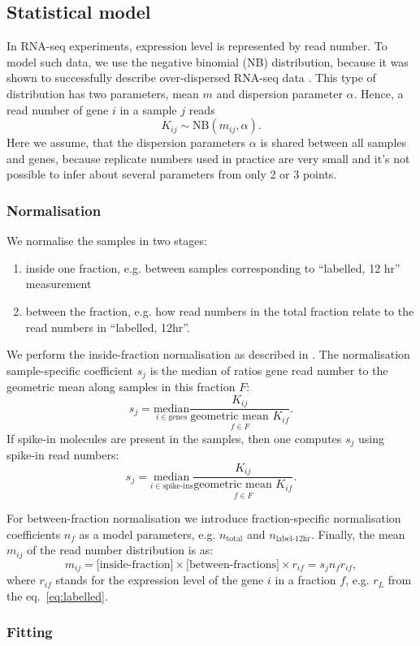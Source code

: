 \subsection{Statistical model}
% 

In RNA-seq experiments, expression level is represented by read number.
To model such data, we use the negative binomial (NB) distribution, 
because it was shown to successfully describe over-dispersed RNA-seq data 
\cite{robinson2007moderated}.
This type of distribution has two parameters, mean $m$ and dispersion parameter 
$\alpha$.
Hence,  a read number of gene $i$ in a sample $j$ reads
\begin{equation}
 K_{ij} \sim \text{NB}(m_{ij}, \alpha).
\end{equation}
Here we assume, that the dispersion parameters $\alpha$ is shared between all
samples and genes, because replicate numbers used in practice are 
very small and it's not possible to infer about several parameters 
from only 2 or 3 points.
\subsubsection{Normalisation}
We normalise the samples in two stages:
\begin{enumerate}
\item inside one fraction,
e.g. between samples corresponding to ``labelled, 12 hr'' measurement
\item between the fraction, 
e.g. how read numbers in the total fraction relate to the read numbers in 
``labelled, 12hr''.
\end{enumerate}
We perform the inside-fraction  normalisation as described in 
\citep{anders2010differential}. The normalisation sample-specific 
coefficient $s_j$ is the median of ratios gene read number to the geometric mean
along samples in this fraction $F$:
\begin{equation}
 s_j = \underset{i\in \text{genes}}{\mathrm{median}}
 \frac{K_{ij}}{\underset{f \in F}{\text{geometric mean }K_{if}}}.
\end{equation}
If spike-in molecules are present in the samples, then one computes $s_{j}$ 
using spike-in read numbers: 
\begin{equation}
 s_j = \underset{i \in \text{spike-ins}}{\mathrm{median}}
 \frac{K_{ij}}{\underset{f \in F}{\text{geometric mean }K_{if}}}.
\end{equation}
\par
For between-fraction normalisation we introduce fraction-specific normalisation 
coefficients $n_f$ as a model parameters, 
e.g. $n_\text{total}$ and $n_\text{label-12hr}$.
Finally, the mean $m_{ij}$ of the read number distribution is  as:
\begin{equation}
 m_{ij} = \text{[inside-fraction]}\times\text{[between-fractions]}\times
 r_{if} = s_jn_fr_{if},
 \end{equation}
where $r_{if}$ stands for the expression level of the gene $i$ in a fraction $f$, e.g.
$r_L$ from the eq.~\ref{eq:labelled}.
\subsubsection{Fitting}